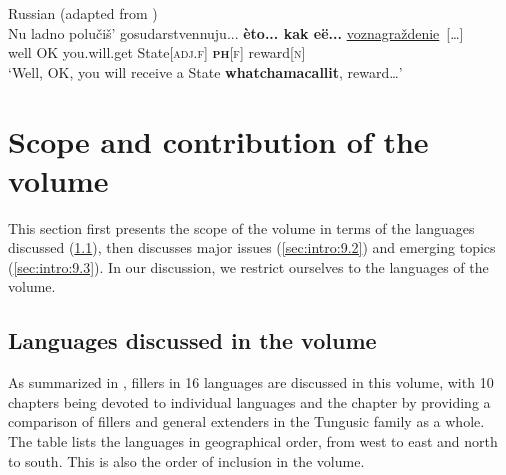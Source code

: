 \documentclass[output=paper]{langscibook}
\begin{document}
\ea\label{ex:intro:26}
{Russian (adapted from \citealt[68]{Podlesskaya2022})}\\
\gll Nu ladno polučiš’ gosudarstvennuju... \textbf{èto... kak eë...} \uline{voznagraždenie}~[…]\\
     well OK you.will.get State[\textsc{adj.f}] \textbf{\textsc{ph}}[\textsc{f}] reward[\textsc{n}] {}\\
\glt ‘Well, OK, you will receive a State \textbf{whatchamacallit}, reward…’
\z

\section{Scope and contribution of the volume}\label{sec:intro:9}

This section first presents the scope of the volume in terms of the languages discussed (\ref{sec:intro:9.1}), then discusses major issues (\ref{sec:intro:9.2}) and emerging topics (\ref{sec:intro:9.3}). In our discussion, we restrict ourselves to the languages of the volume.

\subsection{Languages discussed in the volume}\label{sec:intro:9.1}
As summarized in , fillers in 16 languages are discussed in this volume, with 10 chapters being devoted to individual languages and the chapter by \citeauthor{chapters/klyachko} providing a comparison of fillers and general extenders in the Tungusic family as a whole. The table lists the languages in geographical order, from west to east and north to south. This is also the order of inclusion in the volume.
\end{document}
